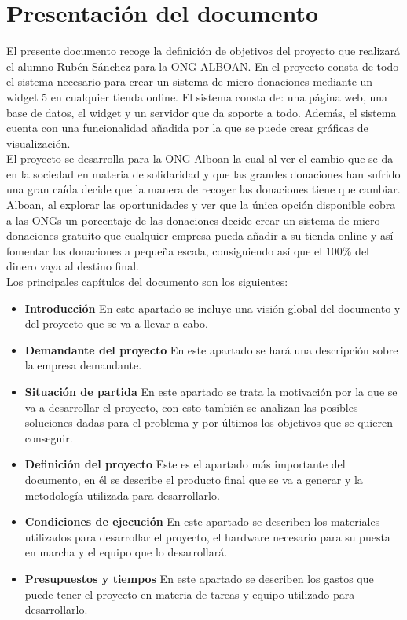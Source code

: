 \section{Presentación del documento}

El presente documento recoge la definición de objetivos del proyecto que realizará el alumno Rubén Sánchez para la ONG ALBOAN. En el proyecto consta de todo el sistema necesario para crear un sistema de micro donaciones mediante un widget 5 en cualquier tienda online. El sistema consta de: una página web, una base de datos, el widget y un servidor que da soporte a todo. Además, el sistema cuenta con una funcionalidad añadida por la que se puede crear gráficas de visualización.\\

El proyecto se desarrolla para la ONG Alboan la cual al ver el cambio que se da en la sociedad en materia de solidaridad y que las grandes donaciones han sufrido una gran caída decide que la manera de recoger las donaciones tiene que cambiar. Alboan, al explorar las oportunidades y ver que la única opción disponible cobra a las ONGs un porcentaje de las donaciones decide crear un sistema de micro donaciones gratuito que cualquier empresa pueda añadir a su tienda online y así fomentar las donaciones a pequeña escala, consiguiendo así que el 100\% del dinero vaya al destino final.\\

Los principales capítulos del documento son los siguientes:

\begin{itemize}
	\item \textbf{Introducción} \smallbreak
	 En este apartado se incluye una visión global del documento y del proyecto que se va a llevar a cabo.
	\item \textbf{Demandante del proyecto} \smallbreak
	 En este apartado se hará una descripción sobre la empresa demandante.
	 \item \textbf{Situación de partida} \smallbreak
	 En este apartado se trata la motivación por la que se va a desarrollar el proyecto, con esto también se analizan las posibles soluciones dadas para el problema y por últimos los objetivos que se quieren conseguir.
	\item \textbf{Definición del proyecto}\smallbreak
	Este es el apartado más importante del documento, en él se describe el producto final que se va a generar y la metodología utilizada para desarrollarlo.
	\item \textbf{Condiciones de ejecución}\smallbreak
	En este apartado se describen los materiales utilizados para desarrollar el proyecto, el hardware necesario para su puesta en marcha y el equipo que lo desarrollará.
	\item \textbf{Presupuestos y tiempos} \smallbreak
	En este apartado se describen los gastos que puede tener el proyecto en materia de tareas y equipo utilizado para desarrollarlo.
\end{itemize}
